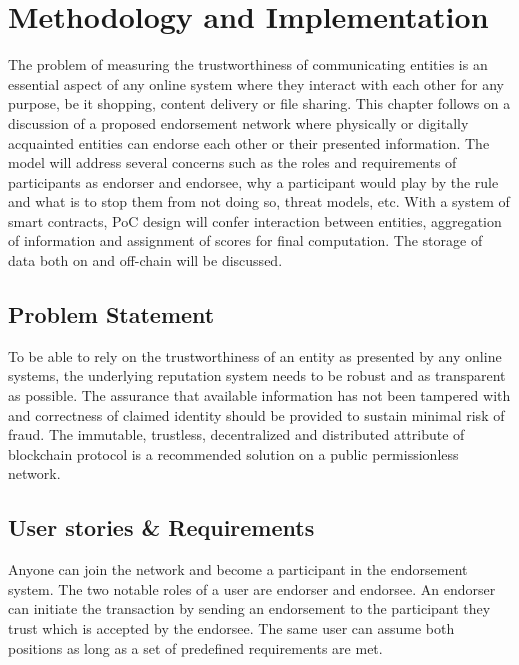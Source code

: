 \chapter{Methodology and Implementation} \label{ch:method}
The problem of measuring the trustworthiness of communicating entities is an
essential aspect of any online system where they interact with each other for
any purpose, be it shopping, content delivery or file sharing. This chapter
follows on a discussion of a proposed endorsement network where physically or
digitally acquainted entities can endorse each other or their presented
information. The model will address several concerns such as the roles and
requirements of participants as endorser and endorsee, why a participant would
play by the rule and what is to stop them from not doing so, threat models,
etc. With a system of smart contracts, PoC design will confer interaction
between entities, aggregation of information and assignment of scores for final
computation. The storage of data both on and off-chain will be discussed.  

\section{Problem Statement}
To be able to rely on the trustworthiness of an entity as presented by any
online systems, the underlying reputation system needs to be robust and as
transparent as possible. The assurance that available information has not been
tampered with and correctness of claimed identity should be provided to sustain
minimal risk of fraud. The immutable, trustless, decentralized and distributed
attribute of blockchain protocol is a recommended solution on a public
permissionless network.

\section{ User stories \& Requirements}
Anyone can join the network and become a participant in the endorsement system.
The two notable roles of a user are endorser and endorsee. An endorser can
initiate the transaction by sending an endorsement to the participant they
trust which is accepted by the endorsee.  The same user can assume both
positions as long as a set of predefined requirements are met.  \\ 

